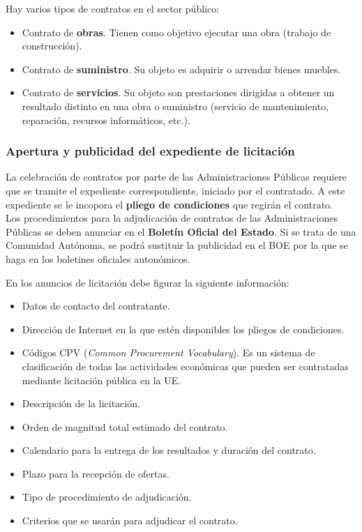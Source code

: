 \documentclass[12pt,spanish]{article}
\begin{document}
Hay varios tipos de contratos en el sector público:

\begin{itemize}
	\item Contrato de \textbf{obras}. Tienen como objetivo ejecutar una obra (trabajo de construcción).
	\item Contrato de \textbf{suministro}. Su objeto es adquirir o arrendar bienes muebles.
	\item Contrato de \textbf{servicios}. Su objeto son prestaciones dirigidas a obtener un resultado distinto en una obra o suministro (servicio de mantenimiento, reparación, recursos informáticos, etc.).
\end{itemize}

\subsubsection{Apertura y publicidad del expediente de licitación}

La  celebración de contratos por parte de las Administraciones Públicas requiere que se tramite el expediente correspondiente, iniciado por el contratado. A este expediente se le incopora el \textbf{pliego de condiciones} que regirán el contrato.\\

Los procedimientos para la adjudicación de contratos de las Administraciones Públicas se deben anunciar en el \textbf{Boletín Oficial del Estado}. Si se trata de una Comunidad Autónoma, se podrá sustituir la publicidad en el BOE por la que se haga en los boletines oficiales autonómicos.

En los anuncios de licitación debe figurar la siguiente información:

\begin{itemize}
	\item Datos de contacto del contratante.
	\item Dirección de Internet en la que estén disponibles los pliegos de condiciones.
	\item Códigos CPV (\textit{Common Procurement Vocabulary}). Es un sistema de clasificación de todas las actividades económicas que pueden ser contratadas mediante licitación pública en la UE.
	\item Descripción de la licitación.
	\item Orden de magnitud total estimado del contrato.
	\item Calendario para la entrega de los resultados y duración del contrato.
	\item Plazo para la recepción de ofertas.
	\item Tipo de procedimiento de adjudicación.
	\item Criterios que se usarán para adjudicar el contrato.
\end{itemize}
\end{document}
